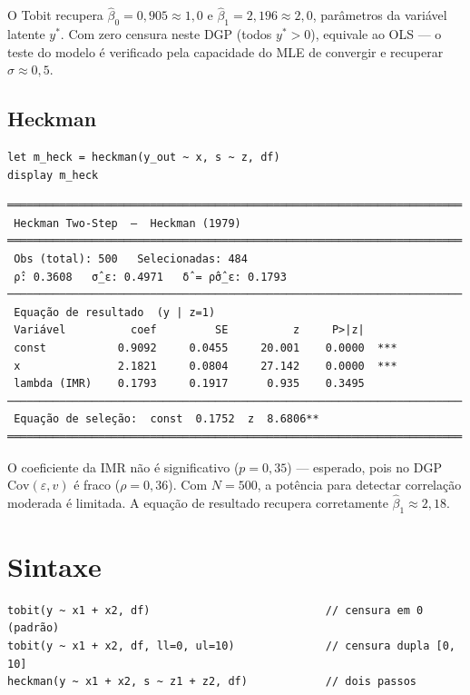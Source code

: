 O Tobit recupera $\hat\beta_0 = 0{,}905 \approx 1{,}0$ e $\hat\beta_1 = 2{,}196 \approx 2{,}0$, parâmetros da variável latente $y^*$. Com zero censura neste DGP (todos $y^* > 0$), equivale ao OLS — o teste do modelo é verificado pela capacidade do MLE de convergir e recuperar $\sigma \approx 0{,}5$.

\subsection*{Heckman}

\begin{lstlisting}
let m_heck = heckman(y_out ~ x, s ~ z, df)
display m_heck
\end{lstlisting}

\begin{lstlisting}[language={}, basicstyle=\ttfamily\small,
  frame=none, numbers=none, backgroundcolor=\color{codbg},
  xleftmargin=0pt, xrightmargin=0pt, breaklines=false]
══════════════════════════════════════════════════════════════════════
 Heckman Two-Step  —  Heckman (1979)
══════════════════════════════════════════════════════════════════════
 Obs (total): 500   Selecionadas: 484
 ρ̂: 0.3608   σ̂_ε: 0.4971   δ̂ = ρ̂σ̂_ε: 0.1793
──────────────────────────────────────────────────────────────────────
 Equação de resultado  (y | z=1)
 Variável          coef         SE          z     P>|z|
 const           0.9092     0.0455     20.001    0.0000  ***
 x               2.1821     0.0804     27.142    0.0000  ***
 lambda (IMR)    0.1793     0.1917      0.935    0.3495
──────────────────────────────────────────────────────────────────────
 Equação de seleção:  const  0.1752  z  8.6806**
══════════════════════════════════════════════════════════════════════
\end{lstlisting}

O coeficiente da IMR não é significativo ($p = 0{,}35$) — esperado, pois no DGP $\mathrm{Cov}(\varepsilon, v)$ é fraco ($\rho = 0{,}36$). Com $N = 500$, a potência para detectar correlação moderada é limitada. A equação de resultado recupera corretamente $\hat\beta_1 \approx 2{,}18$.

\section{Sintaxe}

\begin{lstlisting}
tobit(y ~ x1 + x2, df)                           // censura em 0 (padrão)
tobit(y ~ x1 + x2, df, ll=0, ul=10)              // censura dupla [0, 10]
heckman(y ~ x1 + x2, s ~ z1 + z2, df)            // dois passos
\end{lstlisting}

